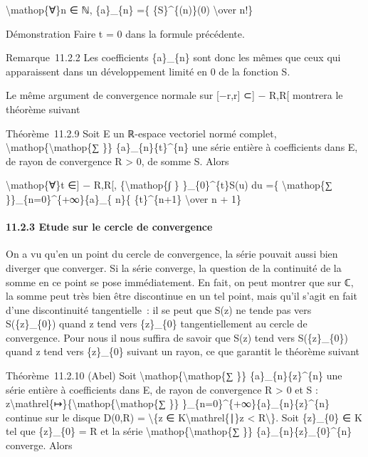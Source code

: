 \documentclass[]{article}
\begin{document}
\textbackslash{}mathop\{∀\}n ∈ ℕ, \{a\}\_\{n\} =\{ \{S\}\^{}\{(n)\}(0)
\textbackslash{}over n!\}

Démonstration Faire t = 0 dans la formule précédente.

Remarque~11.2.2 Les coefficients \{a\}\_\{n\} sont donc les mêmes que
ceux qui apparaissent dans un développement limité en 0 de la fonction
S.

Le même argument de convergence normale sur {[}−r,r{]} ⊂{]} − R,R{[}
montrera le théorème suivant

Théorème~11.2.9 Soit E un ℝ-espace vectoriel normé complet,
\textbackslash{}mathop\{\textbackslash{}mathop\{∑ \}\}
\{a\}\_\{n\}\{t\}\^{}\{n\} une série entière à coefficients dans E, de
rayon de convergence R \textgreater{} 0, de somme S. Alors

\textbackslash{}mathop\{∀\}t ∈{]} − R,R{[}, \{\textbackslash{}mathop\{∫
\} \}\_\{0\}\^{}\{t\}S(u) du =\{ \textbackslash{}mathop\{∑
\}\}\_\{n=0\}\^{}\{+∞\}\{a\}\_\{ n\}\{ \{t\}\^{}\{n+1\}
\textbackslash{}over n + 1\}

\paragraph{11.2.3 Etude sur le cercle de convergence}

On a vu qu'en un point du cercle de convergence, la série pouvait aussi
bien diverger que converger. Si la série converge, la question de la
continuité de la somme en ce point se pose immédiatement. En fait, on
peut montrer que sur ℂ, la somme peut très bien être discontinue en un
tel point, mais qu'il s'agit en fait d'une discontinuité tangentielle~:
il se peut que S(z) ne tende pas vers S(\{z\}\_\{0\}) quand z tend vers
\{z\}\_\{0\} tangentiellement au cercle de convergence. Pour nous il
nous suffira de savoir que S(z) tend vers S(\{z\}\_\{0\}) quand z tend
vers \{z\}\_\{0\} suivant un rayon, ce que garantit le théorème suivant

Théorème~11.2.10 (Abel) Soit
\textbackslash{}mathop\{\textbackslash{}mathop\{∑ \}\}
\{a\}\_\{n\}\{z\}\^{}\{n\} une série entière à coefficients dans E, de
rayon de convergence R \textgreater{} 0 et S :
z\textbackslash{}mathrel\{↦\}\{\textbackslash{}mathop\{\textbackslash{}mathop\{∑
\}\} \}\_\{n=0\}\^{}\{+∞\}\{a\}\_\{n\}\{z\}\^{}\{n\} continue sur le
disque D(0,R) = \textbackslash{}\{z ∈
K\textbackslash{}mathrel\{∣\}\textbar{}z\textbar{} \textless{}
R\textbackslash{}\}. Soit \{z\}\_\{0\} ∈ K tel que
\textbar{}\{z\}\_\{0\}\textbar{} = R et la série
\textbackslash{}mathop\{\textbackslash{}mathop\{∑ \}\}
\{a\}\_\{n\}\{z\}\_\{0\}\^{}\{n\} converge. Alors
\end{document}
